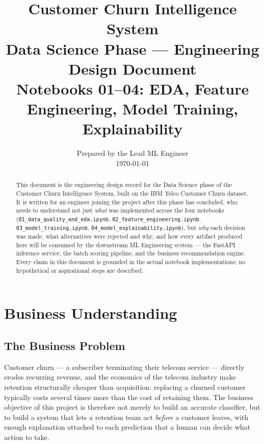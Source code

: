 \documentclass[11pt]{article}
\title{
  \vspace{-1.5cm}
  {\Large\bfseries\color{navy} Customer Churn Intelligence System}\\[0.3em]
  {\large\color{steel} Data Science Phase --- Engineering Design Document}\\[0.2em]
  {\small\color{gray} Notebooks 01--04: EDA, Feature Engineering, Model Training, Explainability}
}
\author{}
\date{\small Prepared by the Lead ML Engineer \\ \today}
\begin{document}
\maketitle
\thispagestyle{fancy}

\begin{abstract}
\noindent
This document is the engineering design record for the Data Science phase of the Customer Churn Intelligence System, built on the IBM Telco Customer Churn dataset. It is written for an engineer joining the project after this phase has concluded, who needs to understand not just \emph{what} was implemented across the four notebooks (\texttt{01\_data\_quality\_and\_eda.ipynb}, \texttt{02\_feature\_engineering.ipynb}, \texttt{03\_model\_training.ipynb}, \texttt{04\_model\_explainability.ipynb}), but \emph{why} each decision was made, what alternatives were rejected and why, and how every artifact produced here will be consumed by the downstream ML Engineering system --- the FastAPI inference service, the batch scoring pipeline, and the business recommendation engine. Every claim in this document is grounded in the actual notebook implementations; no hypothetical or aspirational steps are described.
\end{abstract}

\tableofcontents
\newpage

\section{Business Understanding}

\subsection{The Business Problem}

Customer churn --- a subscriber terminating their telecom service --- directly erodes recurring revenue, and the economics of the telecom industry make retention structurally cheaper than acquisition: replacing a churned customer typically costs several times more than the cost of retaining them. The business objective of this project is therefore not merely to build an accurate classifier, but to build a system that lets a retention team act \emph{before} a customer leaves, with enough explanation attached to each prediction that a human can decide what action to take.
\end{document}
